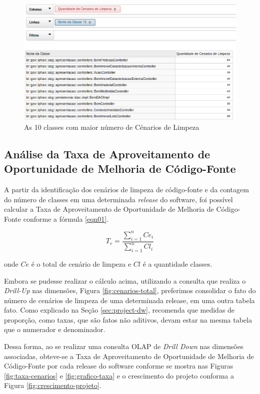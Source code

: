 \begin{figure}[ht!]
\centering
\includegraphics[keepaspectratio=true,scale=0.6]{figuras/10-best.eps}
\caption{As 10 classes com maior número de Cénarios de Limpeza}
\label{fig:worst-10-cenarios}
\end{figure}
\FloatBarrier


\subsection{Análise da Taxa de Aproveitamento de Oportunidade de Melhoria de Código-Fonte}

A partir da identificação dos cenários de limpeza de código-fonte e da contagem do número de classes em uma determinada \textit{release} do software, foi possível calcular a Taxa de Aproveitamento de Oportunidade de Melhoria de Código-Fonte conforme a fórmula \ref{eqn01}.

\begin{equation}
\label{eqn01}
T_r =   \frac{{\sum_{i=1}^{n}{Ce_i}}}{\sum_{i=1}^{n}{Cl_i}}
\end{equation}

onde $ Ce $ é o total de cenário de limpeza e $ Cl $ é a quantidade classes.

 Embora se pudesse realizar o cálculo acima, utilizando a consulta que realiza o \textit{Drill-Up} nas dimensões, Figura \ref{fig:cenarios-total}, preferimos consolidar o fato do número de cenários de limpeza de uma determinada release, em uma outra tabela fato. Como explicado na Seção \ref{sec:project-dw},  recomenda que medidas de proporção, como taxas, que são fatos não aditivos, devam estar na mesma tabela que o numerador e denominador.

 Dessa forma, ao se realizar uma consulta OLAP de \textit{Drill Down} nas dimensões associadas, obteve-se a Taxa de Aproveitamento de Oportunidade de Melhoria de Código-Fonte por cada release do software conforme se mostra nas Figuras \ref{fig:taxa-cenarios} e \ref{fig:grafico-taxa} e o crescimento do projeto conforma a Figura \ref{fig:crescimento-projeto}. 


